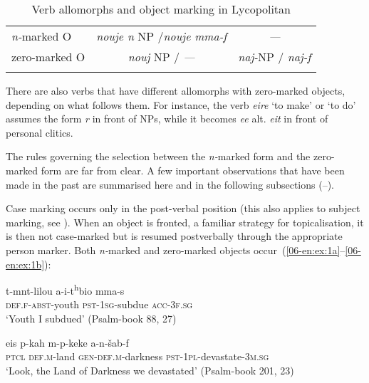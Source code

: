 \documentclass[output=paper]{LSP/langsci}
\begin{document}
\begin{table}
\begin{tabular}{lcc}
\lsptoprule
\textit{n-}marked O & \textit{nouje n} NP /\textit{nouje mma-f} & \textit{—}\\
zero-marked O & \textit{nouj} NP / \textit{—} & \textit{naj-}NP / \textit{naj-f}\\
\lspbottomrule
\end{tabular}
\caption{Verb allomorphs and object marking in Lycopolitan}\label{tab-06-en:1}
\end{table}

There are also verbs that have different allomorphs with zero-marked objects, depending on what follows them. For instance, the verb \textit{eire} ‘to make’ or ‘to do’ assumes the form \textit{r} in front of NPs, while it becomes \textit{ee} alt. \textit{eit} in front of personal clitics. 

The rules governing the selection between the \textit{n-}marked form and the zero-marked form are far from clear. A few important observations that have been made in the past are summarised here and in the following subsections (--). 

Case marking occurs only in the post-verbal position (this also applies to subject marking, see \citealt{Grossman2015Verb}). When an object is fronted, a familiar strategy for topicalisation, it is then not case-marked but is resumed postverbally through the appropriate person marker. Both \textit{n-}marked and zero-marked objects occur~(\ref{06-en:ex:1a}--\ref{06-en:ex:1b}):

\begin{exe}
\ex 
\begin{xlist}
\ex \label{06-en:ex:1a}
\gll t-mnt-lilou a-i-t\textsuperscript{h}bio mma-s\\
	\textsc{def.f-abst-}youth \textsc{pst-1sg-}subdue \textsc{acc-3f.sg}\\
\glt ‘Youth I subdued’ (Psalm-book 88, 27)

\ex\label{06-en:ex:1b}
\gll eis p-kah m-p-keke a-n-šab-f\\
	\textsc{ptcl} \textsc{def.m-}land \textsc{gen-def.m-}darkness \textsc{pst-1pl-}devastate\textsc{-3m.sg}\\
\glt ‘Look, the Land of Darkness we devastated’ (Psalm-book 201, 23)

\end{xlist}
\end{exe}
\end{document}
